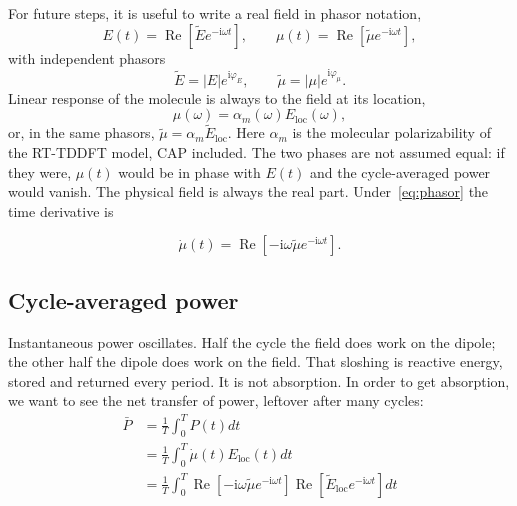 \documentclass[11pt,a4paper]{article}
\newcommand{\Eloc}{E_{\mathrm{loc}}}
\newcommand{\om}{\omega}
\newcommand{\alpm}{\alpha_m}
\newcommand{\re}[1]{\operatorname{Re}[#1]}
\begin{document}
\noindent
For future steps, it is useful to write a real field in phasor notation,
\begin{equation}
  E(t)
  =
  \re{\tilde E e^{-\mathrm{i}\om t}},
  \qquad
  \mu(t)
  =
  \re{\tilde\mu e^{-\mathrm{i}\om t}},
  \label{eq:phasor}
\end{equation}
with independent phasors 
\begin{equation}
  \tilde E
  =
  \lvert E\rvert e^{\mathrm{i}\varphi_E},
  \qquad
  \tilde\mu
  =
  \lvert\mu\rvert e^{\mathrm{i}\varphi_{\mu}}.
  \label{eq:phasor-amp}
\end{equation}
Linear response of the molecule is always to the field at its location,
\begin{equation}
  \mu(\om)
  =
  \alpm(\om)\Eloc(\om),
  \label{eq:mu}
\end{equation}
or, in the same phasors, $\tilde\mu=\alpm\tilde E_{\mathrm{loc}}$.
Here $\alpm$ is the molecular polarizability of the RT-TDDFT model, CAP included.
The two phases are not assumed equal: if they were, $\mu(t)$ would be in phase with $E(t)$ and the cycle-averaged power would vanish.
The physical field is always the real part.
Under~\eqref{eq:phasor} the time derivative is

\begin{equation}
  \dot{\mu}(t)
  =
  \re{-\mathrm{i}\om\tilde\mu e^{-\mathrm{i}\om t}}.
  \label{eq:mudot}
\end{equation}

\subsection{Cycle-averaged power}

\noindent Instantaneous power oscillates. Half the cycle the field does work on the dipole; the other half the dipole does work on the field. That sloshing is reactive energy, stored and returned every period. It is not absorption. In order to get absorption, we want to see the net transfer of power, leftover after many cycles:
\begin{equation*}
  \begin{aligned}
    \bar{P}&=\frac{1}{T} \int_0^T P(t) dt\\
    &=\frac{1}{T} \int_0^T \dot{\mu}(t)\Eloc(t) dt\\
    &=\frac{1}{T} \int_0^T \re{-\mathrm{i}\om\tilde\mu e^{-\mathrm{i}\om t}} \re{\tilde{E}_{\mathrm{loc}} e^{-\mathrm{i}\om t}} dt
  \end{aligned}
\end{equation*}
\end{document}
